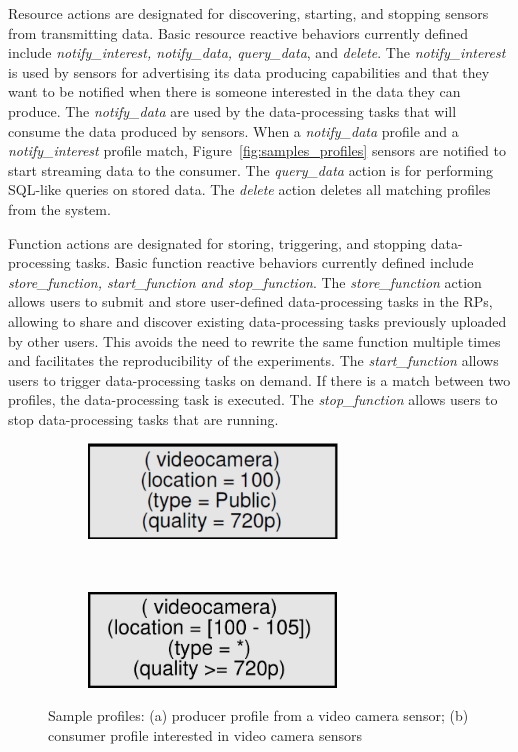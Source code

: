 Resource actions are designated for discovering, starting, and stopping sensors from transmitting data. Basic resource reactive behaviors currently defined include {\it notify\_interest, notify\_data, query\_data}, and {\it delete}. The {\it notify\_interest} is used by sensors for advertising its data producing capabilities and that they want to be notified when there is someone interested in the data they can produce. The {\it notify\_data} are used by the data-processing tasks that will consume the data produced by sensors. When a {\it notify\_data} profile and a {\it notify\_interest} profile match, Figure~\ref{fig:samples_profiles} sensors are notified to start streaming data to the consumer. The {\it query\_data } action is for performing SQL-like queries on stored data. The {\it delete} action deletes all matching profiles from the system.

Function actions are designated for storing, triggering, and stopping data-processing tasks. Basic function reactive behaviors currently defined include {\it store\_function, start\_function and stop\_function}. The {\it store\_function} action allows users to submit and store user-defined data-processing tasks in the RPs, allowing to share and discover existing data-processing tasks previously uploaded by other users. This avoids the need to rewrite the same function multiple times and facilitates the reproducibility of the experiments. The {\it start\_function} allows users to trigger data-processing tasks on demand. %
If there is a match between two profiles, the data-processing task is executed. The {\it stop\_function} allows users to stop data-processing tasks that are running. %

\begin{figure}
    \centering
    \begin{subfigure}[t]{0.5\textwidth}
        \centering
        \includegraphics[height=1in]{Figures/data_profile.pdf}
        \caption{}
        \label{fig:data_profile}
    \end{subfigure}%
    ~ 
    \begin{subfigure}[t]{0.5\textwidth}
        \centering
        \includegraphics[height=1in]{Figures/interest_profile.pdf}
        \caption{}
        \label{fig:interest_profile}
    \end{subfigure}
    \caption{Sample profiles: (a) producer profile from a video camera sensor; (b) consumer profile interested in video camera sensors}
\end{figure}


